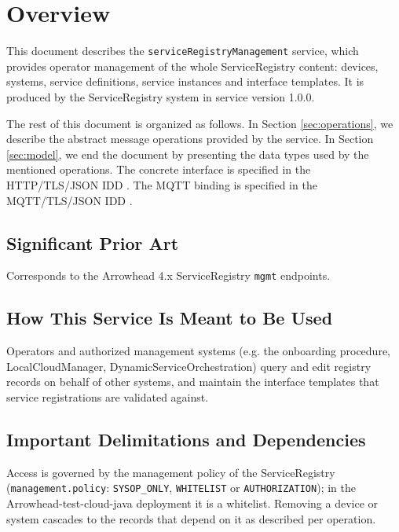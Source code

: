 \documentclass[a4paper]{arrowhead}
\begin{document}
\section{Overview}
\label{sec:overview}

This document describes the \texttt{service\allowbreak{}Registry\allowbreak{}Management} service, which provides operator management of the whole ServiceRegistry content: devices, systems, service definitions, service instances and interface templates.
It is produced by the ServiceRegistry system \cite{sr-sysd} in service version 1.0.0.

The rest of this document is organized as follows.
In Section \ref{sec:operations}, we describe the abstract message operations provided by the service.
In Section \ref{sec:model}, we end the document by presenting the data types used by the mentioned operations.
The concrete interface is specified in the HTTP/TLS/JSON IDD \cite{sr-serviceRegistryManagement-http-idd}. The MQTT binding is specified in the MQTT/TLS/JSON IDD \cite{sr-serviceRegistryManagement-mqtt-idd}.

\subsection{Significant Prior Art}

Corresponds to the Arrowhead 4.x ServiceRegistry \texttt{mgmt} endpoints.

\subsection{How This Service Is Meant to Be Used}

Operators and authorized management systems (e.g. the onboarding procedure, LocalCloudManager, Dynamic\allowbreak{}Service\allowbreak{}Orchestration) query and edit registry records on behalf of other systems, and maintain the interface templates that service registrations are validated against.

\subsection{Important Delimitations and Dependencies}
\label{sec:delimitations}

Access is governed by the management policy of the ServiceRegistry (\texttt{management.\allowbreak{}policy}: \texttt{SYSOP\_\allowbreak{}ONLY}, \texttt{WHITELIST} or \texttt{AUTHORIZATION}); in the Arrowhead-test-cloud-java deployment it is a whitelist. Removing a device or system cascades to the records that depend on it as described per operation.
\end{document}
